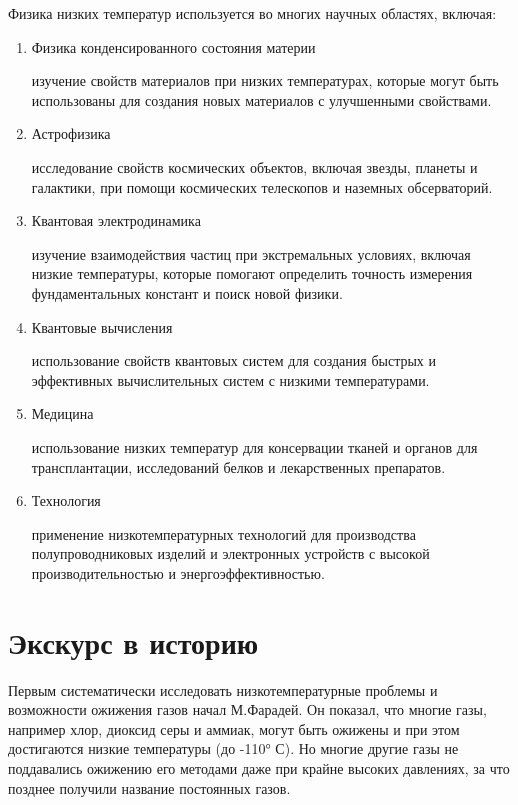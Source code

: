 \documentclass[bachelor,och,referat]{SCWorks_corrected}
\begin{document}
Физика низких температур используется во многих научных областях, включая:\begin{enumerate}
    \item Физика конденсированного состояния материи
    
    изучение свойств материалов при низких температурах, которые могут быть использованы для создания новых материалов с улучшенными свойствами.

    \item Астрофизика
    
    исследование свойств космических объектов, включая звезды, планеты и галактики, при помощи космических телескопов и наземных обсерваторий.

    \item Квантовая электродинамика
    
    изучение взаимодействия частиц при экстремальных условиях, включая низкие температуры, которые помогают определить точность измерения фундаментальных констант и поиск новой физики.

    \item Квантовые вычисления
    
    использование свойств квантовых систем для создания быстрых и эффективных вычислительных систем с низкими температурами.

    \item Медицина
    
    использование низких температур для консервации тканей и органов для трансплантации, исследований белков и лекарственных препаратов.

    \item Технология
    
    применение низкотемпературных технологий для производства полупроводниковых изделий и электронных устройств с высокой производительностью и энергоэффективностью.

\end{enumerate}

\section{Экскурс в историю}

Первым систематически исследовать низкотемпературные проблемы и возможности ожижения газов начал М.Фарадей. Он показал, что многие газы, например хлор, диоксид серы и аммиак, могут быть ожижены и при этом достигаются низкие температуры (до -110° С). Но многие другие газы не поддавались ожижению его методами даже при крайне высоких давлениях, за что позднее получили название постоянных газов.
\end{document}
